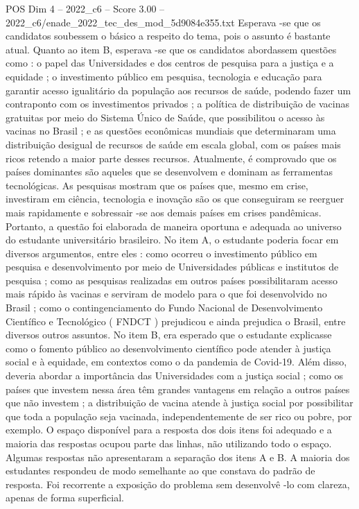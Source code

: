 \begin{textsample}{POS Dim 4 – 2022\_c6 – Score 3.00 – 2022\_c6/enade\_2022\_tec\_des\_mod\_5d9084e355.txt}
Esperava -se que os candidatos soubessem o básico a respeito do tema, pois o assunto é bastante atual.
Quanto ao item B, esperava -se que os candidatos abordassem questões como : o papel das Universidades e dos centros de pesquisa para a justiça e a equidade ; o investimento público em pesquisa, tecnologia e educação para garantir acesso igualitário da população aos recursos de saúde, podendo fazer um contraponto com os investimentos privados ; a política de distribuição de vacinas gratuitas por meio do Sistema Único de Saúde, que possibilitou o acesso às vacinas no Brasil ; e as questões econômicas mundiais que determinaram uma distribuição desigual de recursos de saúde em escala global, com os países mais ricos retendo a maior parte desses recursos.
Atualmente, é comprovado que os países dominantes são aqueles que se desenvolvem e dominam as ferramentas tecnológicas.
As pesquisas mostram que os países que, mesmo em crise, investiram em ciência, tecnologia e inovação são os que conseguiram se reerguer mais rapidamente e sobressair -se aos demais países em crises pandêmicas.
Portanto, a questão foi elaborada de maneira oportuna e adequada ao universo do estudante universitário brasileiro.
No item A, o estudante poderia focar em diversos argumentos, entre eles : como ocorreu o investimento público em pesquisa e desenvolvimento por meio de Universidades públicas e institutos de pesquisa ; como as pesquisas realizadas em outros países possibilitaram acesso mais rápido às vacinas e serviram de modelo para o que foi desenvolvido no Brasil ; como o contingenciamento do Fundo Nacional de Desenvolvimento Científico e Tecnológico ( FNDCT ) prejudicou e ainda prejudica o Brasil, entre diversos outros assuntos.
No item B, era esperado que o estudante explicasse como o fomento público ao desenvolvimento científico pode atender à justiça social e à equidade, em contextos como o da pandemia de Covid-19.
Além disso, deveria abordar a importância das Universidades com a justiça social ; como os países que investem nessa área têm grandes vantagens em relação a outros países que não investem ; a distribuição de vacina atende à justiça social por possibilitar que toda a população seja vacinada, independentemente de ser rico ou pobre, por exemplo.
O espaço disponível para a resposta dos dois itens foi adequado e a maioria das respostas ocupou parte das linhas, não utilizando todo o espaço.
Algumas respostas não apresentaram a separação dos itens A e B.
A maioria dos estudantes respondeu de modo semelhante ao que constava do padrão de resposta.
Foi recorrente a exposição do problema sem desenvolvê -lo com clareza, apenas de forma superficial.

\end{textsample}
